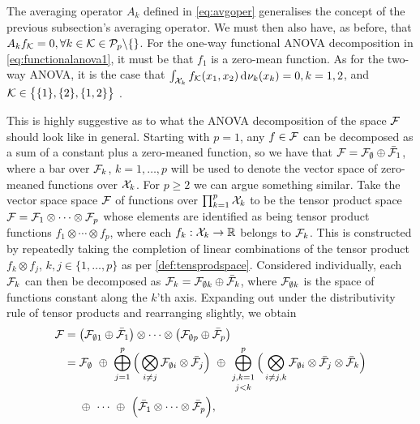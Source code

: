 The averaging operator $A_k$ defined in \cref{eq:avgoper} generalises the concept of the previous subsection's averaging operator.
We must then also have, as before, that $A_kf_{\mathcal K} = 0, \forall k \in {\mathcal K} \in {\mathcal P}_p\backslash\{\}$.
For the one-way functional ANOVA decomposition in \cref{eq:functionalanova1}, it must be that $f_1$ is a zero-mean function.
As for the two-way ANOVA, it is the case that $\int_{{\mathcal X}_k} f_{\mathcal K}(x_1,x_2) \operatorname{d}\hspace{0.5pt}\!\nu_k(x_k) = 0, k=1,2$, and ${\mathcal K} \in \big\{ \{1\}, \{2\}, \{1,2\} \big\}$ \citep{durrande2013anova}.

This is highly suggestive as to what the ANOVA decomposition of the space ${\mathcal F}$ should look like in general.
Starting with $p=1$, any $f \in {\mathcal F}$ can be decomposed as a sum of a constant plus a zero-meaned function, so we have that
${\mathcal F} = {\mathcal F}_\emptyset \oplus \bar{{\mathcal F}}_1$, where 
a bar over ${\mathcal F}_k$, $k=1,\dots,p$ will be used to denote the vector space of zero-meaned functions over ${\mathcal X}_k$.
For $p\geq 2$ we can argue something similar.
Take the vector space space ${\mathcal F}$ of functions over $\prod_{k=1}^p {\mathcal X}_k$ to be the tensor product space ${\mathcal F} = {\mathcal F}_1 \otimes \cdots \otimes {\mathcal F}_p$ whose elements are identified as being tensor product functions $f_1 \otimes\cdots\otimes f_p$, where each $f_k:{\mathcal X}_k\to\mathbb{R}$ belongs to ${\mathcal F}_k$.
This is constructed by repeatedly taking the completion of linear combinations of the tensor product $f_k \otimes f_j$, $k,j\in\{1,\dots,p\}$ as per \cref{def:tensprodspace}.
Considered individually, each ${\mathcal F}_k$ can then be decomposed as ${\mathcal F}_k = {\mathcal F}_{\emptyset k} \oplus \bar{{\mathcal F}}_k$, where ${\mathcal F}_{\emptyset k}$ is the space of functions constant along the $k$'th axis.
Expanding out under the distributivity rule of tensor products and rearranging slightly, we obtain
\begin{align}
  \cF ={}& \big( \cF_{\emptyset 1} \oplus \bar\cF_1 \big) \otimes \cdots \otimes 
  \big( \cF_{\emptyset p} \oplus \bar\cF_p \big) \nonumber \\
  ={}& \cF_{\emptyset}
  \ \oplus \
  \bigoplus_{j=1}^p 
  \Big( \bigotimes_{i\neq j}\cF_{\emptyset i} \otimes \bar\cF_j \Big) 
  \ \oplus \
  \mathop{\bigoplus_{j,k=1}^p}_{j<k} 
  \Big( \bigotimes_{i\neq j,k}\cF_{\emptyset i} \otimes \bar\cF_j \otimes \bar\cF_k \Big)
  \label{eq:funcanovaspace} \\
  & \oplus \ 
  \cdots 
  \ \oplus \ 
  \Big( \bar\cF_1 \otimes \cdots \otimes \bar\cF_p \Big), \nonumber
\end{align}
